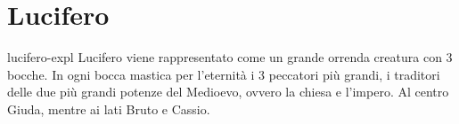 \documentclass[preview]{standalone}
\begin{document}

\section{Lucifero}

\begin{snippet}{lucifero-expl}
    Lucifero viene rappresentato come un grande orrenda creatura con 3 bocche.
    In ogni bocca mastica per l'eternità i 3 peccatori più grandi, i traditori
    delle due più grandi potenze del Medioevo, ovvero la chiesa e l'impero.
    Al centro Giuda, mentre ai lati Bruto e Cassio. 
\end{snippet}
\end{document}

